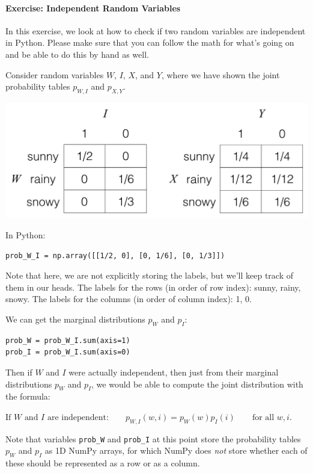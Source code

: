 \documentclass[6008notes.tex]{subfiles}
\begin{document}
\paragraph{Exercise: Independent Random Variables}  In this exercise, we look at how to check if two random variables are independent in Python. Please make sure that you can follow the math for what's going on and be able to do this by hand as well.

Consider random variables $W$, $I$, $X$, and $Y$, where we have shown the joint probability tables $p_{W,I}$ and $p_{X,Y}$.

{\centering\includegraphics[scale=0.4]{images_sec-joint-rv-ex-marg} \par}

In Python:

\begin{lstlisting}
prob_W_I = np.array([[1/2, 0], [0, 1/6], [0, 1/3]])
\end{lstlisting}

Note that here, we are not explicitly storing the labels, but we'll keep track of them in our heads. The labels for the rows (in order of row index): sunny, rainy, snowy. The labels for the columns (in order of column index): 1, 0.

We can get the marginal distributions $p_W$ and $p_I$:

\begin{lstlisting}
prob_W = prob_W_I.sum(axis=1)
prob_I = prob_W_I.sum(axis=0)
\end{lstlisting}

Then if $W$ and $I$ were actually independent, then just from their marginal distributions $p_W$ and $p_I$, we would be able to compute the joint distribution with the formula:

{\centering$\text {If $W$ and $I$ are independent:} \qquad p_{W,I}(w,i)=p_ W(w)p_ I(i) \qquad \text {for all }w,i.$ \par}
 
Note that variables \lstinline{prob_W} and \lstinline{prob_I} at this point store the probability tables $p_W$ and $p_I$ as 1D NumPy arrays, for which NumPy does \textit{not} store whether each of these should be represented as a row or as a column.
\end{document}
